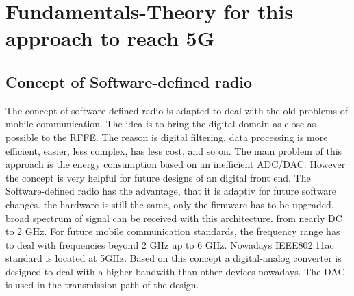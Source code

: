 \chapter{Fundamentals-Theory for this approach to reach 5G}
\label{ch:fundamentals}
\section{Concept of Software-defined radio}
The concept of software-defined radio is adapted to deal with the old problems of mobile communication. The idea is to bring the digital domain as close as possible to the RFFE. The reason is digital filtering, data processing is more efficient, easier, less complex, has less cost, and so on. The main problem of this approach is the energy consumption based on an inefficient ADC/DAC. However the concept is very helpful for future designs of an digital front end. The Software-defined radio has the advantage, that it is adaptiv for future software changes. the hardware is still the same, only the firmware has to be upgraded. broad spectrum of signal can be received with this architecture. from nearly DC to 2 GHz. For future mobile communication standards, the frequency range has to deal with frequencies beyond 2 GHz up to 6 GHz. Nowadays IEEE802.11ac standard is located at 5GHz. Based on this concept a digital-analog converter is designed to deal with a higher bandwith than other devices nowadays. The DAC is used in the transmission path of the design.
